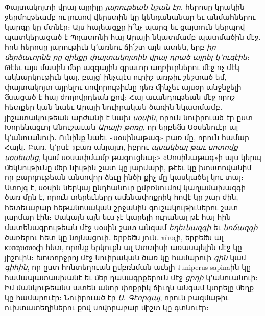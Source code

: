 \documentclass{article}
\begin{document}
{Փայտակոյտի վրայ այրիլը \emph{յարութեան նշան էր․} հերոսը կրակին ջերմութեամբ ու լուսով վերստին կը կենդանանար եւ անմահներու կարգը կը մտնէր։ Այս հայեացքը ի՜նչ պարզ եւ ցայտուն կերպով պատկերացած է Պղատոնի հայ Արայի նկատմամբ պատմածին մէջ․ հոն հերոսը յարութիւն կ՚առնու ճի՛շտ այն ատեն, երբ \emph{իր ﬔրձաւորնե րը զինքը փայտակոյտին վրայ դրած այրել կ՚ուզէին}։ Թէեւ այս մասին ﬔր ազգային գրաւոր աղբիւրներու մէջ ոչ մէկ ակնարկութիւն կայ, բայց՝ ինչպէս ուրիշ առթիւ շեշտած եմ, փայտակոյտ այրելու սովորութիւնը դեռ ﬕնչեւ այսօր անջնջելի ﬓացած է հայ ժողովրդեան քով։ Հայ աւանդութեան մէջ որոշ հետքեր կան նաեւ Արայի նուիրական ծառին նկատմամբ․ յիշատակութեան արժանի է նախ \emph{սօսին}, որուն նուիրուած էր ըստ Խորենացւոյ Անուշաւան \emph{Արայի թոռը}, որ երբեﬓ Սօսենուէր ալ կ՚անուանուի․ Ունինք նաեւ «սօսինաթագ» բառ մը, որուն համար Հայկ․ Բառ․ կ՚ըսէ «բառ անյայտ, իբրու \emph{պսակեալ թաւ սոտովք սօսեանց}, կամ սօսափմամբ թագուցեալ։» «Սոսինաթագ»ի այս կերպ ﬔկնութիւնը ﬔր նիւթին շատ կը յարմարի, թէեւ կը խոստովանիմ որ բարդութեան անսովոր ձեւը ինծի քիչ մը կասկածել կու տայ։ Ստոյգ է, սօսին ներկայ ընդհանուր ըմբռնումով կաղամախազգի ծառ մըն է, որուն տերեւները աﬔնափոքրիկ հովէ կը շար ժին, հետեւաբար հեթանոսական շրջանին գուշակութիւներու շատ յարմար էին։ Սակայն այն եւս չէ կարելի ուրանալ թէ հայ հին մատենագրութեան մէջ սօսին շատ անգամ \emph{եղեւնազգի} եւ \emph{նոճազգի} ծառերու հետ կը նոյնացուի․ երբեﬓ յուն․ πίτυςի, երբեﬓ ալ κυπάρισσοςի հետ, որոնք երկուքն ալ Ատտիսի առասպելին մէջ կը յիշուին։ Խոտորջրոյ մէջ նուիրական ծառ կը համարուի \emph{գին} կամ \emph{գիհին}, որ ըստ հոնտեղուան ըմբռնման աւելի Juniperus sapinaին կը համապատասխանէ եւ ﬔր դասագրքերուն մէջ \emph{ցրդի} կ՚անուանուի։ Իմ մանկութեանս ատեն անոր փոքրիկ ճիւղն անգամ կտրելը ﬔղք կը համարուէր։ Նուիրուած էր \emph{Ս․ Գէորգայ}, որուն բազմաթիւ ուխտատեղիներու քով սովորաբար ﬕշտ կը գտնուէր։

}
\end{document}
